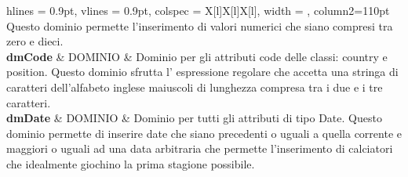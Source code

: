 \begin{tblr}{
    hlines = {0.9pt}, vlines = {0.9pt}, colspec = {X[l]X[l]X[l]}, 
    width = \textwidth , column{2}={110pt}
}
{		Questo dominio permette l'inserimento di
		valori numerici che siano compresi tra zero e dieci.
	}
	\\
	{
		\textbf{dmCode}
	}
	&
	{
		DOMINIO
	}
	&
	{
		Dominio per gli attributi code delle classi:
		country e position.
		Questo dominio sfrutta l' espressione regolare
		che accetta una stringa di caratteri 
		dell'alfabeto inglese maiuscoli di 
		lunghezza compresa tra
		i due e i tre caratteri.
	}
	\\
	{
		\textbf{dmDate}
	}
	&
	{
		DOMINIO
	}
	&
	{
		Dominio per tutti gli attributi di tipo Date.
		Questo dominio permette di inserire date che siano
		precedenti o uguali a quella corrente
		e maggiori o uguali ad una data arbitraria
		che permette l'inserimento di calciatori
		che idealmente giochino la prima stagione
		possibile.
	}
	\\
\end{tblr}


\newpage

